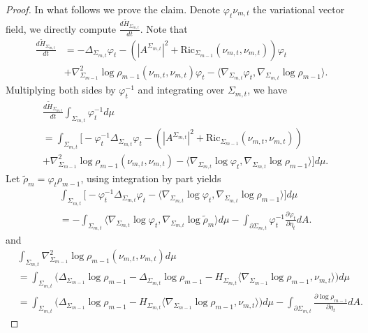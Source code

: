 \documentclass[11pt,letterpaper]{amsart}
\theoremstyle{definition}
\theoremstyle{remark}
\numberwithin{equation}{section}
\begin{document}
\begin{proof}
   In what follows  we prove the claim. Denote $\varphi_{t}\nu_{m,t}$ the variational vector field, we directly compute $\frac{d \tilde{H}_{\Sigma_{m,t}}}{d t}$. Note that
   \[
   \begin{aligned}
   \frac{d\tilde{H}_{\Sigma_{m,t}}}{dt}
   &=-\Delta_{\Sigma_{m,t}}\varphi_{t}-(|A^{\Sigma_{m,t}}|^2+\text{Ric}_{\Sigma_{m-1}}(\nu_{m,t},\nu_{m,t}))\varphi_{t}\\
   &+\nabla_{\Sigma_{m-1}}^{2}\log\rho_{m-1}(\nu_{m,t},\nu_{m,t})\varphi_{t}-\langle \nabla_{\Sigma_{m,t}}\varphi_{t},\nabla_{\Sigma_{m,t}}\log\rho_{m-1}\rangle.
   \end{aligned}
   \]
Multiplying both sides by $\varphi_{t}^{-1}$ and integrating over $\Sigma_{m,t}$, we have
\[
\begin{aligned}
    &\frac{d\tilde{H}_{\Sigma_{m,t}}}{dt}\int_{\Sigma_{m,t}}\varphi_{t}^{-1}d\mu\\
   &=\int_{\Sigma_{m,t}}\Big[-\varphi_{t}^{-1}\Delta_{\Sigma_{m,t}}\varphi_{t}-(|A^{\Sigma_{m,t}}|^2+\text{Ric}_{\Sigma_{m-1}}(\nu_{m,t},\nu_{m,t}))\\
   &+\nabla_{\Sigma_{m-1}}^{2}\log\rho_{m-1}(\nu_{m,t},\nu_{m,t})-\langle \nabla_{\Sigma_{m,t}}\log\varphi_{t},\nabla_{\Sigma_{m,t}}\log\rho_{m-1}\rangle\Big]d\mu.
\end{aligned}
\]
Let $\tilde{\rho}_{m}=\varphi_{t}\rho_{m-1}$, using integration by part yields
\[
\begin{aligned}
    &\int_{\Sigma_{m,t}}\Big[-\varphi_{t}^{-1}\Delta_{\Sigma_{m,t}}\varphi_{t}-\langle \nabla_{\Sigma_{m,t}}\log\varphi_{t},\nabla_{\Sigma_{m,t}}\log\rho_{m-1}\rangle\Big]d\mu\\
    &=-\int_{\Sigma_{m,t}}\langle \nabla_{\Sigma_{m,t}}\log\varphi_{t},\nabla_{\Sigma_{m,t}}\log\tilde{\rho}_{m}\rangle d\mu-\int_{\partial\Sigma_{m,t}}\varphi_{t}^{-1}\frac{\partial \varphi_{t}}{\partial \eta_{t}}dA.
\end{aligned}
\]
and
\[
\begin{aligned}
    &\int_{\Sigma_{m,t}}\nabla_{\Sigma_{m-1}}^{2}\log\rho_{m-1}(\nu_{m,t},\nu_{m,t})d\mu\\
    &=\int_{\Sigma_{m,t}}\Big(\Delta_{\Sigma_{m-1}}\log\rho_{m-1}-\Delta_{\Sigma_{m,t}}\log\rho_{m-1}-H_{\Sigma_{m,t}}\langle \nabla_{\Sigma_{m-1}}\log\rho_{m-1},\nu_{m,t}\rangle\Big)d\mu \\
    &=\int_{\Sigma_{m,t}}\Big(\Delta_{\Sigma_{m-1}}\log\rho_{m-1}-H_{\Sigma_{m,t}}\langle \nabla_{\Sigma_{m-1}}\log\rho_{m-1},\nu_{m,t}\rangle \Big)d\mu-\int_{\partial \Sigma_{m,t}}\frac{\partial \log\rho_{m-1}}{\partial \eta_{t}}dA.

\end{aligned}\]
\end{proof}
\end{document}
